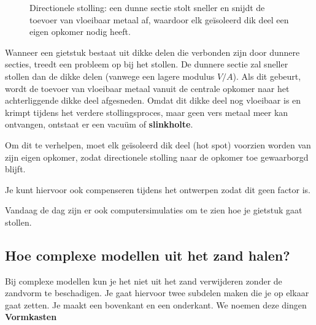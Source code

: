 \documentclass[a4paper,11pt,twoside]{report}
\begin{document}
\begin{figure}[htbp]
    \caption{Directionele stolling: een dunne sectie stolt sneller en snijdt de toevoer van vloeibaar metaal af, waardoor elk geïsoleerd dik deel een eigen opkomer nodig heeft.}
    \label{fig:meerdere_opkomers}
\end{figure}

Wanneer een gietstuk bestaat uit dikke delen die verbonden zijn door dunnere secties,
treedt een probleem op bij het stollen.
De dunnere sectie zal sneller stollen dan de dikke delen (vanwege een lagere modulus $V/A$).
Als dit gebeurt, wordt de toevoer van vloeibaar metaal vanuit de centrale opkomer naar het achterliggende dikke deel afgesneden.
Omdat dit dikke deel nog vloeibaar is en krimpt tijdens het verdere stollingsproces,
maar geen vers metaal meer kan ontvangen, ontstaat er een vacuüm of \textbf{slinkholte}.

Om dit te verhelpen, moet elk geïsoleerd dik deel (hot spot) voorzien worden van zijn eigen opkomer,
zodat directionele stolling naar de opkomer toe gewaarborgd blijft.

Je kunt hiervoor ook compenseren tijdens het ontwerpen zodat dit geen factor is.

Vandaag de dag zijn er ook computersimulaties om te zien hoe je gietstuk gaat stollen.

\subsection{Hoe complexe modellen uit het zand halen?}
Bij complexe modellen kun je het niet uit het zand verwijderen zonder de zandvorm te beschadigen.
Je gaat hiervoor twee subdelen maken die je op elkaar gaat zetten.
Je maakt een bovenkant en een onderkant. We noemen deze dingen \textbf{Vormkasten}
\end{document}
